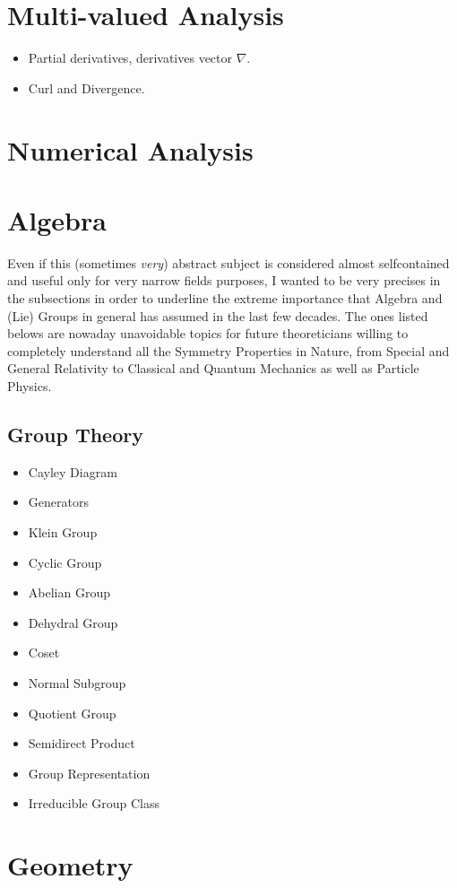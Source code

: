 \documentclass[10pt]{article}
\begin{document}
\section{Multi-valued Analysis}
\begin{itemize}
	\item Partial derivatives, derivatives vector $ \nabla $.
	\item Curl and Divergence. 
\end{itemize}
\section{Numerical Analysis}
\section{Algebra}
Even if this (sometimes \emph{very}) abstract subject is considered almost selfcontained and useful only for very narrow fields purposes, I wanted to be very precises in the subsections in order to underline the extreme importance that Algebra and (Lie) Groups in general has assumed in the last few decades. The ones listed belows are nowaday unavoidable topics for future theoreticians willing to completely understand all the Symmetry Properties in Nature, from Special and General Relativity to Classical and Quantum Mechanics as well as Particle Physics. 
\subsection{Group Theory}
\begin{itemize}
\item Cayley Diagram
\item Generators
\item Klein Group
\item Cyclic Group
\item Abelian Group
\item Dehydral Group
\item Coset
\item Normal Subgroup
\item Quotient Group
\item Semidirect Product
\item Group Representation 
\item Irreducible Group Class
\end{itemize}
\section{Geometry}
\end{document}
